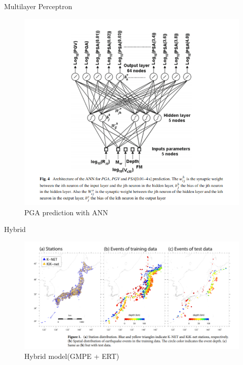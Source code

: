 \documentclass{beamer}
\begin{document}
	\begin{frame}[t]{Multilayer Perceptron}
		\begin{figure}
			\includegraphics[scale=0.4]{mlp.png}
			\caption{PGA prediction with ANN}
		\end{figure}
		
	\end{frame}
	
	\begin{frame}[t]{Hybrid}
		\begin{figure}
			\includegraphics[scale=0.5]{hybrid.png}
			\caption{Hybrid model(GMPE + ERT)}
		\end{figure}
	\end{frame}
	
\end{document}
